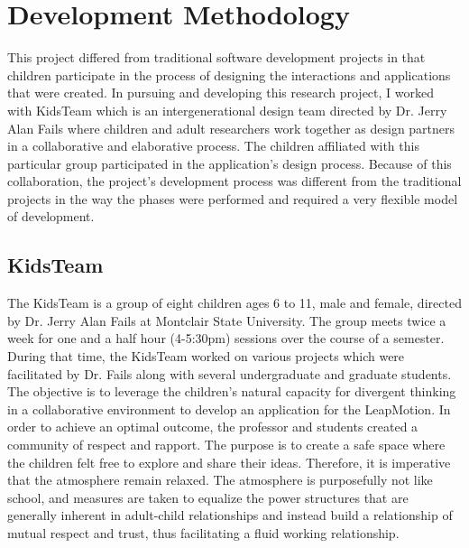 
\chapter{Development Methodology} %

\label{Chapter2} %



This project differed from traditional software development projects in that children participate in the process of designing the interactions and applications that were created. In pursuing and developing this research project, I worked with KidsTeam which is an intergenerational design team  directed by Dr. Jerry Alan Fails where children and adult researchers work together as design partners in a collaborative and elaborative process. The children affiliated with this particular group participated in the application's design process. Because of this collaboration, the project's development process was different from the traditional projects in the way the phases were performed and required a very flexible model of development. 

\section{KidsTeam}
The KidsTeam is a group of eight children ages 6 to 11, male and female, directed by Dr. Jerry Alan Fails at Montclair State University. The group meets twice a week for one and a half hour (4-5:30pm) sessions over the course of a semester. During that time, the KidsTeam worked on various projects which were facilitated by Dr. Fails along with several undergraduate and graduate students. The objective is to leverage the children's natural capacity for divergent thinking in a collaborative environment to develop an application for the LeapMotion. In order to achieve an optimal outcome, the professor and students created a community of respect and rapport. The purpose is to create a safe space where the children felt free to explore and share their ideas. Therefore, it is imperative that the atmosphere remain relaxed. The atmosphere is purposefully not like school, and measures are taken to equalize the power structures that are generally inherent in adult-child relationships and instead build a relationship of mutual respect and trust, thus facilitating a fluid working relationship.

